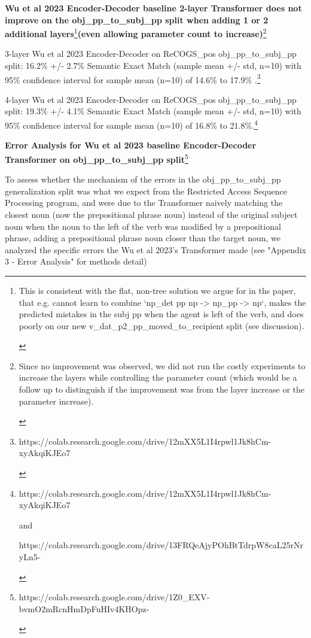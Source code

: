 \documentclass[11pt]{article}
\begin{document}
\textbf{Wu et al 2023 Encoder-Decoder baseline 2-layer Transformer does not improve on the obj\_pp\_to\_subj\_pp split when adding 1 or 2 additional layers}\footnote{
\begin{tiny}
This is consistent with the flat, non-tree solution we argue for in ths paper, that e.g. cannot learn to combine `np\_det pp np -> np\_pp -> np`, makes the predicted mistakes in the subj pp when the agent is left of the verb, and does poorly on our new v\_dat\_p2\_pp\_moved\_to\_recipient split  (see discussion).
\end{tiny}
}\textbf{(even allowing parameter count to increase)}\footnote{
\begin{tiny}
Since no improvement was observed, we did not run the costly experiments to increase the layers while controlling the parameter count (which would be a follow up to distinguish if the improvement was from the layer increase or the parameter increase).
\end{tiny}
}

3-layer Wu et al 2023 Encoder-Decoder on ReCOGS\_pos obj\_pp\_to\_subj\_pp split: 16.2\% +/- 2.7\% Semantic Exact Match (sample mean +/- std, n=10) with 95\% confidence interval for sample mean (n=10) of 14.6\% to 17.9\% .\footnote{ 
\begin{tiny}
https://colab.research.google.com/drive/12mXX5L1I4rpwl1Jk8hCm-xyAkqiKJEo7 
\end{tiny}
}

4-layer Wu et al 2023 Encoder-Decoder on ReCOGS\_pos obj\_pp\_to\_subj\_pp split: 19.3\% +/- 4.1\% Semantic Exact Match (sample mean +/- std, n=10) with 95\% confidence interval for sample mean (n=10) of 16.8\% to 21.8\%.\footnote{ 
\begin{tiny}
https://colab.research.google.com/drive/12mXX5L1I4rpwl1Jk8hCm-xyAkqiKJEo7 

and 

https://colab.research.google.com/drive/13FRQeAjyPOhBtTdrpW8caL25rNryLn5- 
\end{tiny}}

\textbf{Error Analysis for Wu et al 2023 baseline Encoder-Decoder Transformer on obj\_pp\_to\_subj\_pp split}\footnote{
\begin{tiny}
https://colab.research.google.com/drive/1Z0\_EXV-bvmO2mRcnHmDpFuHIv4KHOpz-
\end{tiny}
}

To assess whether the mechanism of the errors in the obj\_pp\_to\_subj\_pp generalization split was what we expect from the Restricted Access Sequence Processing program, and were due to the Transformer naively matching the closest noun (now the prepositional phrase noun) instead of the original subject noun when the noun to the left of the verb was modified by a prepositional phrase, adding a prepositional phrase noun closer than the target noun, we analyzed the specific errors the Wu et al 2023's Transformer made (see "Appendix 3 - Error Analysis" for methods detail)
\end{document}
